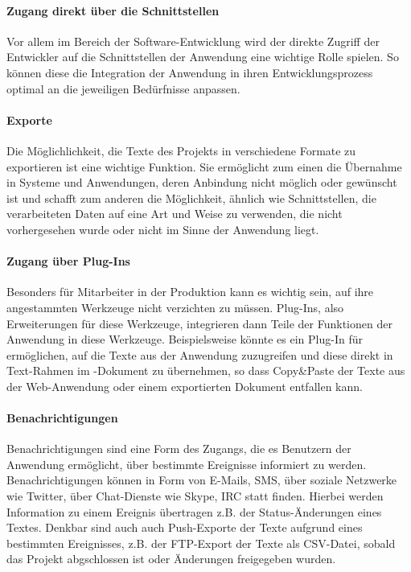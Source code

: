 \paragraph{Zugang direkt über die Schnittstellen} Vor allem im Bereich der Software-Entwicklung wird der direkte Zugriff der Entwickler auf die Schnittstellen der Anwendung eine wichtige Rolle spielen. So können diese die Integration der Anwendung in ihren Entwicklungsprozess optimal an die jeweiligen Bedürfnisse anpassen.

\paragraph{Exporte} Die Möglichlichkeit, die Texte des Projekts in verschiedene Formate zu exportieren ist eine wichtige Funktion. Sie ermöglicht zum einen die Übernahme in Systeme und Anwendungen, deren Anbindung nicht möglich oder gewünscht ist und schafft zum anderen die Möglichkeit, ähnlich wie Schnittstellen, die verarbeiteten Daten auf eine Art und Weise zu verwenden, die nicht vorhergesehen wurde oder nicht im Sinne der Anwendung liegt.

\paragraph{Zugang über Plug-Ins} Besonders für Mitarbeiter in der Produktion kann es wichtig sein, auf ihre angestammten Werkzeuge nicht verzichten zu müssen. Plug-Ins, also Erweiterungen für diese Werkzeuge, integrieren dann Teile der Funktionen der Anwendung in diese Werkzeuge. Beispielsweise könnte es ein Plug-In für  ermöglichen, auf die Texte aus der Anwendung zuzugreifen und diese direkt in Text-Rahmen im -Dokument zu übernehmen, so dass Copy\&Paste der Texte aus der Web-Anwendung oder einem exportierten Dokument entfallen kann.

\paragraph{Benachrichtigungen} Benachrichtigungen sind eine Form des Zugangs, die es Benutzern der Anwendung ermöglicht, über bestimmte Ereignisse informiert zu werden. Benachrichtigungen können in Form von E-Mails, SMS, über soziale Netzwerke wie Twitter, über Chat-Dienste wie Skype, IRC statt finden. Hierbei werden Information zu einem Ereignis übertragen z.B. der Status-Änderungen eines Textes. Denkbar sind auch auch Push-Exporte der Texte aufgrund eines bestimmten Ereignisses, z.B. der FTP-Export der Texte als CSV-Datei, sobald das Projekt abgschlossen ist oder Änderungen freigegeben wurden.

